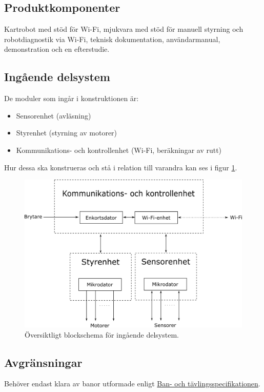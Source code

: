 \documentclass[a4paper,11pt]{article}
\newcommand{\CourseSpecUrl}{https://drive.google.com/file/d/0B6PzdGWZLymjaGZWdHlGeDNfaWs/view?usp=sharing}
\newcommand{\CourseSpecRef}{\href{\CourseSpecUrl}{Ban- och tävlingsspecifikationen}}
\begin{document}
\subsection{Produktkomponenter}
Kartrobot med stöd för Wi-Fi, mjukvara med stöd för manuell styrning och robotdiagnostik via Wi-Fi, teknisk dokumentation, användarmanual, demonstration och en efterstudie. 

\subsection{Ingående delsystem}
De moduler som ingår i konstruktionen är:
\begin{itemize}
    \item Sensorenhet (avläsning) 
    \item Styrenhet (styrning av motorer) 
    \item Kommunikations- och kontrollenhet (Wi-Fi, beräkningar av rutt) 
\end{itemize}
Hur dessa ska konstrueras och stå i relation till varandra kan ses i figur \ref{fig:all_subsystems}.

\newpage

\begin{figure}[h!]
    \centering
    \includegraphics[scale=1]{modules.png}
    \caption{Översiktligt blockschema för ingående delsystem.}
    \label{fig:all_subsystems}
\end{figure}

\subsection{Avgränsningar}
Behöver endast klara av banor utformade enligt \CourseSpecRef. 
\end{document}
